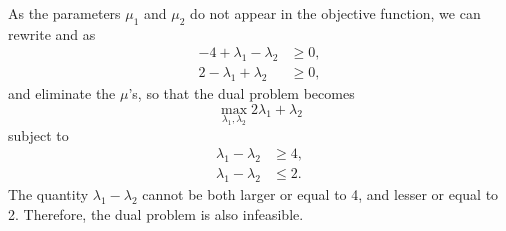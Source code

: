 As the parameters $\mu_1$ and $\mu_2$ do not appear in the objective
function, we 
can rewrite
 and  as
\begin{align*}
  -4+\lambda_1-\lambda_2 & \geq 0, \\
  2-\lambda_1+\lambda_2 & \geq 0,
\end{align*}
and eliminate the $\mu$'s, so that the dual problem becomes
\[
\max_{\lambda_1,\lambda_2} 2\lambda_1 + \lambda_2
\]
subject to
\begin{align*}
  \lambda_1-\lambda_2 & \geq 4, \\
  \lambda_1-\lambda_2 & \leq 2.
\end{align*}
The quantity $\lambda_1-\lambda_2$ cannot be both larger or equal to
4, and lesser or equal to 2. Therefore, the dual problem is also
infeasible. 

